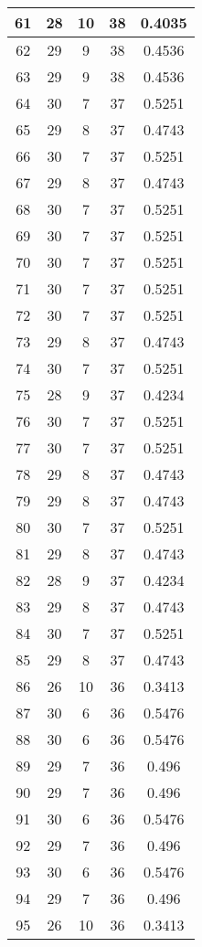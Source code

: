 \documentclass[letterpaper, 12pt]{article}
\begin{document}
\begin{longtable}{|c|c|c|c|c|}
61 & 28 & 10 & 38 & 0.4035 \\
\hline
62 & 29 & 9 & 38 & 0.4536 \\
\hline
63 & 29 & 9 & 38 & 0.4536 \\
\hline
64 & 30 & 7 & 37 & 0.5251 \\
\hline
65 & 29 & 8 & 37 & 0.4743 \\
\hline
66 & 30 & 7 & 37 & 0.5251 \\
\hline
67 & 29 & 8 & 37 & 0.4743 \\
\hline
68 & 30 & 7 & 37 & 0.5251 \\
\hline
69 & 30 & 7 & 37 & 0.5251 \\
\hline
70 & 30 & 7 & 37 & 0.5251 \\
\hline
71 & 30 & 7 & 37 & 0.5251 \\
\hline
72 & 30 & 7 & 37 & 0.5251 \\
\hline
73 & 29 & 8 & 37 & 0.4743 \\
\hline
74 & 30 & 7 & 37 & 0.5251 \\
\hline
75 & 28 & 9 & 37 & 0.4234 \\
\hline
76 & 30 & 7 & 37 & 0.5251 \\
\hline
77 & 30 & 7 & 37 & 0.5251 \\
\hline
78 & 29 & 8 & 37 & 0.4743 \\
\hline
79 & 29 & 8 & 37 & 0.4743 \\
\hline
80 & 30 & 7 & 37 & 0.5251 \\
\hline
81 & 29 & 8 & 37 & 0.4743 \\
\hline
82 & 28 & 9 & 37 & 0.4234 \\
\hline
83 & 29 & 8 & 37 & 0.4743 \\
\hline
84 & 30 & 7 & 37 & 0.5251 \\
\hline
85 & 29 & 8 & 37 & 0.4743 \\
\hline
86 & 26 & 10 & 36 & 0.3413 \\
\hline
87 & 30 & 6 & 36 & 0.5476 \\
\hline
88 & 30 & 6 & 36 & 0.5476 \\
\hline
89 & 29 & 7 & 36 & 0.496 \\
\hline
90 & 29 & 7 & 36 & 0.496 \\
\hline
91 & 30 & 6 & 36 & 0.5476 \\
\hline
92 & 29 & 7 & 36 & 0.496 \\
\hline
93 & 30 & 6 & 36 & 0.5476 \\
\hline
94 & 29 & 7 & 36 & 0.496 \\
\hline
95 & 26 & 10 & 36 & 0.3413 \\

\end{longtable}
\end{document}
